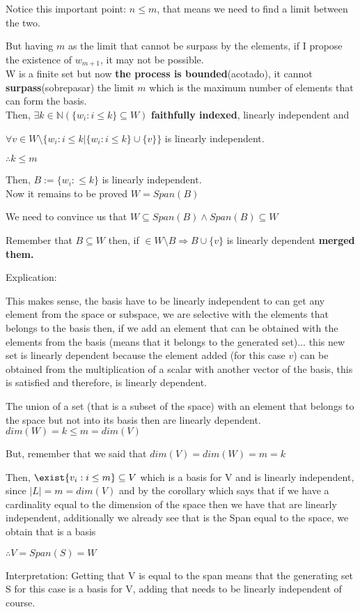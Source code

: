 \documentclass{article}
\begin{document}
\begin{itemize}
    Notice this important point: \(n \leq m\), that means we need to find a limit between the two.
   
    But having \(m\) as the limit that cannot be surpass by the elements, if I propose the existence of \(w_{m+1}\), it may not be possible.
    \\

    W is a finite set but now \textbf{the process is bounded}(acotado), it cannot \textbf{surpass}(sobrepasar) the limit \(m\) which is the maximum number of elements that can form the basis.
    \\
    
    Then, \(\exists k \in \mathbb{N} (\{w_i : i \leq k\} \subseteq W)\) \textbf{faithfully indexed}, linearly independent and

    \(\forall v \in W\text{\textbackslash}\{w_i : i \leq k | \{w_i : i\leq k\}\cup \{v\}\}\) is linearly independent.

    \(\therefore k \leq m\)

    Then, \(B:=\{w_i : \leq k\}\) is linearly independent.
    \\
    
    Now it remains to be proved \(W = Span(B)\)

    We need to convince us that \(W \subseteq Span(B) \land Span(B) \subseteq W\)

    Remember that \(B \subseteq W\) then, if \( \in W\text{\textbackslash} B \Rightarrow B \cup \{v\}\) is linearly dependent \textbf{merged them.}

    Explication:
    
    This makes sense, the basis have to be linearly independent to can get any element from the space or subspace, we are selective with the elements that belongs to the basis then, if we add an element that can be obtained with the elements from the basis (means that it belongs to the generated set)... this new set is linearly dependent because the element added (for this case \(v\)) can be obtained from the multiplication of a scalar with another vector of the basis, this is satisfied and therefore, is linearly dependent.

    The union of a set (that is a subset of the space) with an element that belongs to the space but not into its basis then are linearly dependent.
    \\
    
    \(dim(W) = k \leq m = dim(V)\)

    But, remember that we said that \(dim(V) = dim(W) = m = k\)

    Then, \(\exist \{v_i : i \leq m \} \subseteq V\) which is a basis for V and is linearly independent, since \(|L| = m = dim(V)\) and by the corollary which says that if we have a cardinality equal to the dimension of the space then we have that are linearly independent, additionally we already see that is the Span equal to the space, we obtain that is a basis

    \(\therefore V = Span(S) = W\)

    Interpretation: Getting that V is equal to the span means that the generating set S for this case is a basis for V, adding that needs to be linearly independent of course.
\end{itemize}
\end{document}
